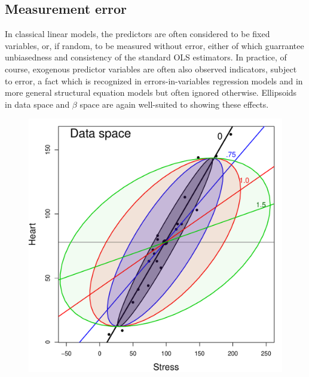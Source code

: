 \subsection{Measurement error}
In classical linear models, the predictors are often considered to be fixed
variables, or, if random, to be measured without error, either of which guarrantee
unbiasedness and consistency of the standard OLS estimators.
In practice, of course, exogenous predictor variables are often also observed
indicators, subject to error, a fact which is recognized in errors-in-variables
regression models and in more general structural equation models
but often ignored otherwise.  Ellipsoids in data space and $\beta$ space
are again well-suited to showing these effects.

\begin{figure}[htb]
 \begin{minipage}[b]{.49\linewidth}
  \centering
  \includegraphics[width=1\linewidth]{fig/coffee-stress1}
 \end{minipage}%
 \hfill
 \begin{minipage}[b]{.49\linewidth}
  \centering

\end{minipage}
\end{figure}
